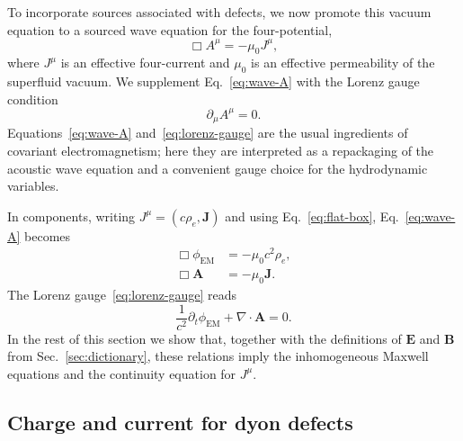 \documentclass[11pt]{article}
\begin{document}
To incorporate sources associated with defects, we now promote this vacuum equation to a sourced wave equation for the four-potential,
\begin{equation}
\Box A^\mu = -\mu_0 J^\mu,
\label{eq:wave-A}
\end{equation}
where $J^\mu$ is an effective four-current and $\mu_0$ is an effective permeability of the superfluid vacuum.  We supplement Eq.~\eqref{eq:wave-A} with the Lorenz gauge condition
\begin{equation}
\partial_\mu A^\mu = 0.
\label{eq:lorenz-gauge}
\end{equation}
Equations~\eqref{eq:wave-A} and~\eqref{eq:lorenz-gauge} are the usual ingredients of covariant electromagnetism; here they are interpreted as a repackaging of the acoustic wave equation and a convenient gauge choice for the hydrodynamic variables.

In components, writing $J^\mu = (c\rho_e,\mathbf{J})$ and using Eq.~\eqref{eq:flat-box}, Eq.~\eqref{eq:wave-A} becomes
\begin{align}
\Box \phi_{\mathrm{EM}} &= -\mu_0 c^2 \rho_e,
\label{eq:wave-phi}\\[4pt]
\Box \mathbf{A} &= -\mu_0 \mathbf{J}.
\label{eq:wave-A-spatial}
\end{align}
The Lorenz gauge~\eqref{eq:lorenz-gauge} reads
\begin{equation}
\frac{1}{c^2}\partial_t \phi_{\mathrm{EM}} + \nabla\cdot\mathbf{A} = 0.
\label{eq:lorenz-gauge-flat}
\end{equation}
In the rest of this section we show that, together with the definitions of $\mathbf{E}$ and $\mathbf{B}$ from Sec.~\ref{sec:dictionary}, these relations imply the inhomogeneous Maxwell equations and the continuity equation for $J^\mu$.

\subsection{Charge and current for dyon defects}
\end{document}
